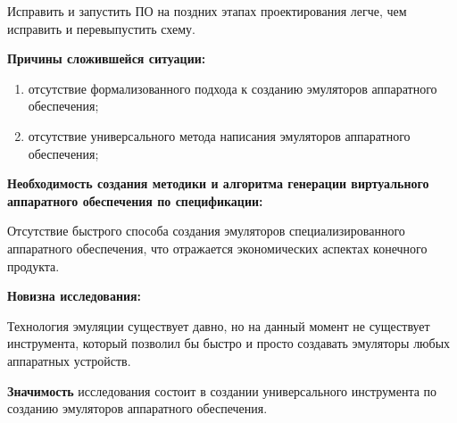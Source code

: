 Исправить и запустить ПО на поздних этапах проектирования легче, чем исправить и перевыпустить схему.

\textbf{Причины сложившейся ситуации:}
\begin{enumerate}[label={\arabic*)}]
    \item отсутствие формализованного подхода к созданию эмуляторов аппаратного обеспечения;
    \item отсутствие универсального метода написания эмуляторов аппаратного обеспечения;
\end{enumerate}

\textbf{Необходимость создания методики и алгоритма генерации виртуального аппаратного
обеспечения по спецификации:}

Отсутствие быстрого способа создания эмуляторов специализированного аппаратного обеспечения, что отражается
экономических аспектах конечного продукта.

\textbf{Новизна исследования:}

Технология эмуляции существует давно, но на данный момент не существует инструмента, который позволил
бы быстро и просто создавать эмуляторы любых аппаратных устройств.

\textbf{Значимость} исследования состоит в создании универсального инструмента по созданию
эмуляторов аппаратного обеспечения.
